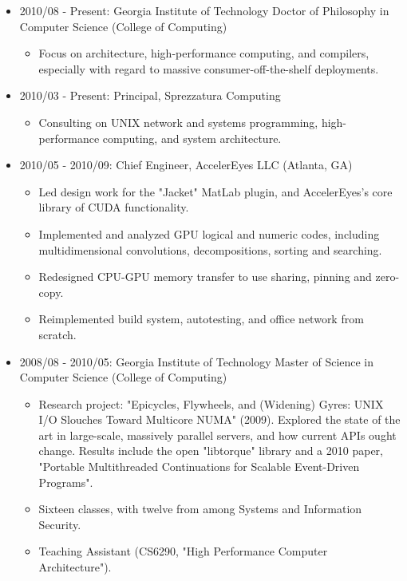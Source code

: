 \documentclass{article}
\newenvironment{tightitemize}
{\begin{itemize}
  \setlength{\itemsep}{1pt}
  \setlength{\parskip}{0pt}
  \setlength{\parsep}{0pt}}
{\end{itemize}}
\begin{document}
\begin{tightitemize}
\item 2010/08 - Present: Georgia Institute of Technology
Doctor of Philosophy in Computer Science (College of Computing)

\begin{tightitemize}
\item Focus on architecture, high-performance computing, and compilers,
  especially with regard to massive consumer-off-the-shelf deployments.
\end{tightitemize}

\item 2010/03 - Present: Principal, Sprezzatura Computing

\begin{tightitemize}
\item Consulting on UNIX network and systems programming, high-performance
  computing, and system architecture.
\end{tightitemize}

\item 2010/05 - 2010/09: Chief Engineer, AccelerEyes LLC (Atlanta, GA)
\begin{tightitemize}
\item Led design work for the "Jacket" MatLab plugin, and AccelerEyes's core library of CUDA functionality.
\item Implemented and analyzed GPU logical and numeric codes, including multidimensional convolutions, decompositions, sorting and searching.
\item Redesigned CPU-GPU memory transfer to use sharing, pinning and zero-copy.
\item Reimplemented build system, autotesting, and office network from scratch.
\end{tightitemize}

\item 2008/08 - 2010/05: Georgia Institute of Technology
Master of Science in Computer Science (College of Computing)

\begin{tightitemize}
\item Research project: "Epicycles, Flywheels, and (Widening) Gyres: UNIX I/O
  Slouches Toward Multicore NUMA" (2009). Explored the state of the art in
  large-scale, massively parallel servers, and how current APIs ought
  change. Results include the open "libtorque" library and a 2010 paper,
  "Portable Multithreaded Continuations for Scalable Event-Driven Programs".
\item Sixteen classes, with twelve from among Systems and Information Security.
\item Teaching Assistant (CS6290, "High Performance Computer Architecture").
\end{tightitemize}


\end{tightitemize}
\end{document}
